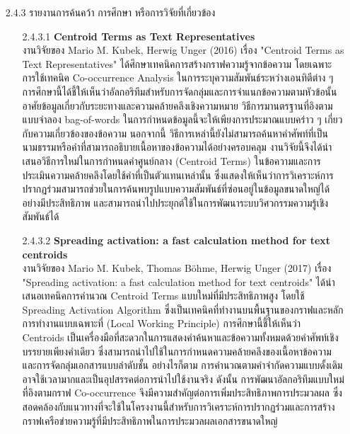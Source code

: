\documentclass[12pt,a4paper]{article}
\begin{document}
\begin{enumerate}[leftmargin=2cm]
{\begin{enumerate}
            \item[2.4.3] รายงานการค้นคว้า การศึกษา หรือการวิจัยที่เกี่ยวข้อง
            \vspace{0.05cm}
             \begin{enumerate}
                \item[2.4.3.1] \textbf{Centroid Terms as Text Representatives}
                \\
                งานวิจัยของ Mario M. Kubek, Herwig Unger (2016) เรื่อง "Centroid Terms as Text Representatives" ได้ศึกษาเทคนิคการสร้างกราฟความรู้จากข้อความ โดยเฉพาะการใช้เทคนิค Co-occurrence Analysis ในการระบุความสัมพันธ์ระหว่างเอนทิตีต่าง ๆ การศึกษานี้ได้ชี้ให้เห็นว่าอัลกอริทึมสำหรับการจัดกลุ่มและการจำแนกข้อความตามหัวข้อนั้นอาศัยข้อมูลเกี่ยวกับระยะทางและความคล้ายคลึงเชิงความหมาย วิธีการมานตรฐานที่อิงตามแบบจำลอง bag-of-words ในการกำหนดข้อมูลนี้จะให้เพียงการประมาณแบบคร่าว ๆ เกี่ยวกับความเกี่ยวข้องของข้อความ นอกจากนี้ วิธีการเหล่านี้ยังไม่สามารถค้นหาคำศัพท์ที่เป็นนามธรรมหรือคำที่สามารถอธิบายเนื้อหาของข้อความได้อย่างครอบคลุม งานวิจัยนี้จึงได้นำเสนอวิธีการใหม่ในการกำหนดคำศูนย์กลาง (Centroid Terms) ในข้อความและการประเมินความคล้ายคลึงโดยใช้คำที่เป็นตัวแทนเหล่านั้น ซึ่งแสดงให้เห็นว่าการวิเคราะห์การปรากฏร่วมสามารถช่วยในการค้นพบรูปแบบความสัมพันธ์ที่ซ่อนอยู่ในข้อมูลขนาดใหญ่ได้อย่างมีประสิทธิภาพ และสามารถนำไปประยุกต์ใช้ในการพัฒนาระบบวิศวกรรมความรู้เชิงสัมพันธ์ได้                 
                    \item[2.4.3.2] \textbf{Spreading activation: a fast calculation method for text centroids}
                \\
                งานวิจัยของ Mario M. Kubek, Thomas Böhme, Herwig Unger (2017) เรื่อง "Spreading activation: a fast calculation method for text centroids" ได้นำเสนอเทคนิคการคำนวณ Centroid Terms แบบใหม่ที่มีประสิทธิภาพสูง โดยใช้ Spreading Activation Algorithm ซึ่งเป็นเทคนิคที่ทำงานบนพื้นฐานของกราฟและหลักการทำงานแบบเฉพาะที่ (Local Working Principle) การศึกษานี้ชี้ให้เห็นว่า Centroids เป็นเครื่องมือที่สะดวกในการแสดงคำค้นหาและข้อความทั้งหมดด้วยคำศัพท์เชิงบรรยายเพียงคำเดียว ซึ่งสามารถนำไปใช้ในการกำหนดความคล้ายคลึงของเนื้อหาข้อความและการจัดกลุ่มเอกสารแบบลำดับชั้น อย่างไรก็ตาม การคำนวณตามคำจำกัดความแบบดั้งเดิมอาจใช้เวลามากและเป็นอุปสรรคต่อการนำไปใช้งานจริง ดังนั้น การพัฒนาอัลกอริทึมแบบใหม่ที่อิงตามกราฟ Co-occurrence จึงมีความสำคัญต่อการเพิ่มประสิทธิภาพการประมวลผล ซึ่งสอดคล้องกับแนวทางที่จะใช้ในโครงงานนี้สำหรับการวิเคราะห์การปรากฏร่วมและการสร้างกราฟเครือข่ายความรู้ที่มีประสิทธิภาพในการประมวลผลเอกสารขนาดใหญ่


\end{enumerate}
\end{enumerate}}
\end{enumerate}
\end{document}
